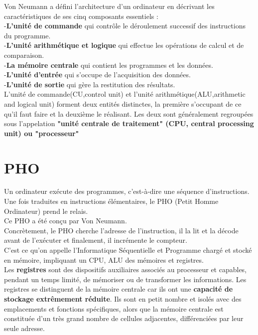 \documentclass{report}
\begin{document}
Von Neumann a défini l'architecture d'un ordinateur en décrivant les caractéristiques de ses cinq composants essentiels :\\
-{\bf L'unité de commande} qui contrôle le déroulement successif des instructions du programme.\\
-{\bf L'unité arithmétique et logique} qui effectue les opérations de calcul et de comparaison.\\
-{\bf La mémoire centrale } qui contient les programmes et les données.\\
-{\bf L'unité d'entrée} qui s'occupe de l'acquisition des données.\\
-{\bf L'unité de sortie} qui gère la restitution des résultats.\\

L'unité de commande(CU,control unit) et l'unité arithmétique(ALU,arithmetic and logical unit) forment deux entités distinctes, la première s'occupant de ce qu'il faut faire et la deuxième le réalisant. Les deux sont généralement regroupées sous l'appelation {\bf "unité centrale de traitement" (CPU, central processing unit) ou "processeur"}\\

\section{PHO}
Un ordinateur exécute des programmes, c'est-à-dire une séquence d'instructions. Une fois traduites en instructions élémentaires, le PHO (Petit Homme Ordinateur) prend le relais.\\
Ce PHO a été conçu par Von Neumann.\\
Concrètement, le PHO cherche l'adresse de l'instruction, il la lit et la décode avant de l'exécuter et finalement, il incrémente le compteur.\\
C'est ce qu'on appelle l'Informatique Séquentielle et Programme chargé et stocké en mémoire, impliquant un CPU, ALU des mémoires et registres.\\  Les {\bf registres} sont des dispositifs auxiliaires associés au processeur et capables, pendant un temps limité, de mémoriser ou de transformer les informations. Les registres se distinguent de la mémoire centrale car ils ont une {\bf capacité de stockage extrêmement réduite}. Ils sont en petit nombre et isolés avec des emplacements et fonctions spécifiques, alors que la mémoire centrale est constituée d'un très grand nombre de cellules adjacentes, différenciées par leur seule adresse. \\ 
\end{document}
